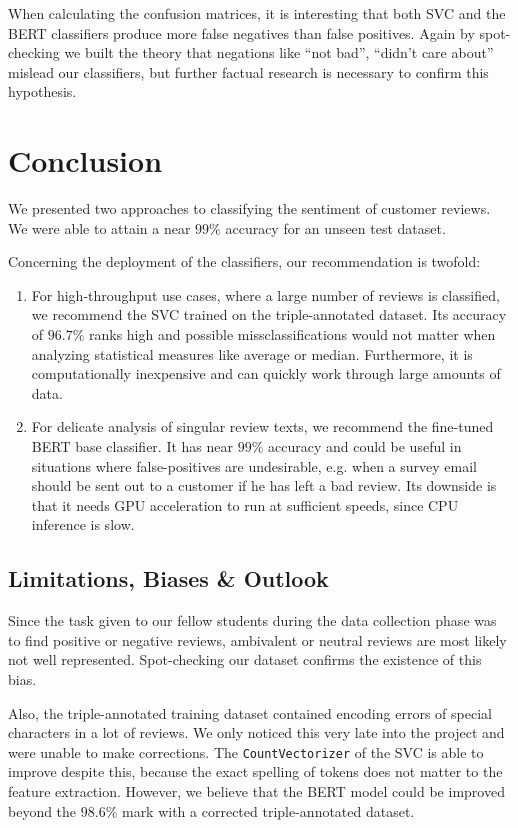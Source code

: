 \documentclass[11pt]{article}
\begin{document}
When calculating the confusion matrices, it is interesting that both SVC and the BERT classifiers produce more false negatives than false positives.
Again by spot-checking we built the theory that negations like \enquote{not bad}, \enquote{didn't care about} mislead our classifiers, but further factual research is necessary to confirm this hypothesis.

\section{Conclusion}

We presented two approaches to classifying the sentiment of customer reviews.
We were able to attain a near $99\%$ accuracy for an unseen test dataset.

Concerning the deployment of the classifiers, our recommendation is twofold:
\begin{enumerate}
    \item For high-throughput use cases, where a large number of reviews is classified, we recommend the SVC trained on the triple-annotated dataset. Its accuracy of $96.7\%$ ranks high and possible missclassifications would not matter when analyzing statistical measures like average or median. Furthermore, it is computationally inexpensive and can quickly work through large amounts of data.
    \item For delicate analysis of singular review texts, we recommend the fine-tuned BERT base classifier. It has near $99\%$ accuracy and could be useful in situations where false-positives are undesirable, e.g. when a survey email should be sent out to a customer if he has left a bad review. Its downside is that it needs GPU acceleration to run at sufficient speeds, since CPU inference is slow. 
\end{enumerate}

\subsection{Limitations, Biases \& Outlook}
\label{sec:limitations}

Since the task given to our fellow students during the data collection phase was to find positive or negative reviews, ambivalent or neutral reviews are most likely not well represented.
Spot-checking our dataset confirms the existence of this bias.

Also, the triple-annotated training dataset contained encoding errors of special characters in a lot of reviews.
We only noticed this very late into the project and were unable to make corrections.
The \texttt{CountVectorizer} of the SVC is able to improve despite this, because the exact spelling of tokens does not matter to the feature extraction.
However, we believe that the BERT model could be improved beyond the $98.6\%$ mark with a corrected triple-annotated dataset.
\end{document}
